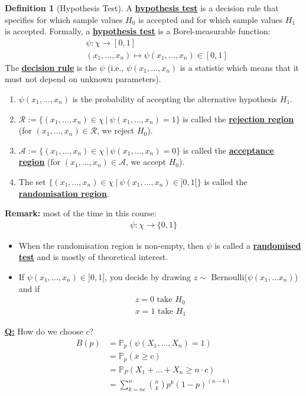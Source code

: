 \documentclass[11pt]{scrartcl}
\theoremstyle{definition}
\newtheorem{definition}{Definition}
\theoremstyle{remark}
\newcommand{\dfn}[1]{\textbf{\underline{#1}}}
\begin{document}
{\begin{definition}[Hypothesis Test]
	A \dfn{hypothesis test} is a decision rule that specifies for which sample values $H_0$ is accepted and for which sample values $H_1$ is accepted. Formally, a \dfn{hypothesis test} is a Borel-measurable function: 
	\begin{align*}
		& \psi: \chi \rightarrow [0,1] \\
		& (x_1, ..., x_n) \mapsto \psi(x_1, ..., x_n) \in [0,1] 
	\end{align*}
	The \dfn{decision rule} is the $\psi$ (i.e., $\psi(x_1, ..., x_n) $ is a statistic which means that it must not depend on unknown parameters). 
	\begin{enumerate}[noitemsep]
		\item $\psi(x_1, ..., x_n)$ is the probability of accepting the alternative hypothesis $H_1$. 
		\item $\mathcal{R} := \{ (x_1, ..., x_n) \in \chi\ |\ \psi(x_1, ..., x_n) = 1 \}$ is called the \dfn{rejection region} (for $(x_1, ..., x_n) \in \mathcal{R}$, we reject $H_0$). 
		\item $\mathcal{A} := \{ (x_1, ..., x_n) \in \chi\ |\ \psi(x_1, ..., x_n) = 0 \}$ is called the \dfn{acceptance region} (for $(x_1, ..., x_n) \in \mathcal{A}$, we accept $H_0$). 
		\item The set $\{ (x_1, ..., x_n) \in \chi\ |\ \psi(x_1, ..., x_n) \in ]0,1[ \}$ is called the \dfn{randomisation region}. 
	\end{enumerate}
\end{definition}

\textbf{Remark:} most of the time in this course: 
\begin{align*}
	\psi: \chi \rightarrow \{ 0,1 \} 
\end{align*}
\begin{itemize}[noitemsep]
	\item When the randomisation region is non-empty, then $\psi$ is called a \dfn{randomised test} and is mostly of theoretical interest. 
	\item If $\psi(x_1, ..., x_n) \in ]0,1[$, you decide by drawing $z \sim $ Bernoulli($\psi (x_1, ...x_n)$) and if
	\begin{align*}
		z = 0 \text{ take } H_0 \\
		x = 1 \text{ take } H_1 
	\end{align*}
\end{itemize}
\textbf{\underline{Q:}} How do we choose $c$? 
\begin{align*}
	B(p) & = \mathbb{P}_p (\psi (X_1, ..., X_n) = 1 ) \\
		 & = \mathbb{P}_p (\overline{x} \geq c ) \\
		 & = \mathbb{P}_P (X_1 + ... + X_n \geq n \cdot c ) \\
		 & = \sum_{k = nc}^n \binom{n}{k} p^k (1-p)^{(n-k)} 
\end{align*}


}
\end{document}
